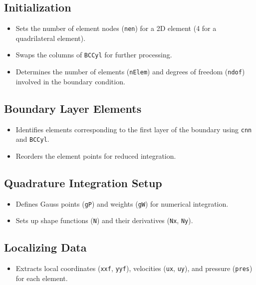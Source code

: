 \documentclass[a4paper,12pt]{article} %
\begin{document}
\subsection*{Initialization}
\begin{itemize}
    \item Sets the number of element nodes (\texttt{nen}) for a 2D element (4 for a quadrilateral element).
    \item Swaps the columns of \texttt{BCCyl} for further processing.
    \item Determines the number of elements (\texttt{nElem}) and degrees of freedom (\texttt{ndof}) involved in the boundary condition.
\end{itemize}

\subsection*{Boundary Layer Elements}
\begin{itemize}
    \item Identifies elements corresponding to the first layer of the boundary using \texttt{cnn} and \texttt{BCCyl}.
    \item Reorders the element points for reduced integration.
\end{itemize}

\subsection*{Quadrature Integration Setup}
\begin{itemize}
    \item Defines Gauss points (\texttt{gP}) and weights (\texttt{gW}) for numerical integration.
    \item Sets up shape functions (\texttt{N}) and their derivatives (\texttt{Nx}, \texttt{Ny}).
\end{itemize}

\subsection*{Localizing Data}
\begin{itemize}
    \item Extracts local coordinates (\texttt{xxf}, \texttt{yyf}), velocities (\texttt{ux}, \texttt{uy}), and pressure (\texttt{pres}) for each element.
\end{itemize}
\end{document}
